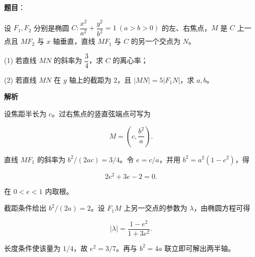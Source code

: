 \begin{answer}

\textbf{题目}：

设 $F_1,F_2$ 分别是椭圆 $C:\dfrac{x^2}{a^2}+\dfrac{y^2}{b^2}=1\ (a>b>0)$ 的左、右焦点，$M$ 是 $C$ 上一点且 $MF_2$ 与 $x$ 轴垂直，直线 $MF_1$ 与 $C$ 的另一个交点为 $N$。

(1) 若直线 $MN$ 的斜率为 $\dfrac34$，求 $C$ 的离心率；

(2) 若直线 $MN$ 在 $y$ 轴上的截距为 $2$，且 $|MN|=5|F_1N|$，求 $a,b$。

\textbf{解析}


设焦距半长为 $c$。过右焦点的竖直弦端点可写为

\nopagebreak[4]
\[
M=\left(c,\frac{b^2}{a}\right).
\]

直线 $MF_1$ 的斜率为 $b^2/(2ac)=3/4$。令 $e=c/a$，并用 $b^2=a^2(1-e^2)$，得

\nopagebreak[4]
\[
2e^2+3e-2=0.
\]

在 $0<e<1$ 内取根。


截距条件给出 $b^2/(2a)=2$。设 $F_1M$ 上另一交点的参数为 $\lambda$，由椭圆方程可得

\nopagebreak[4]
\[
|\lambda|=\frac{1-e^2}{1+3e^2}.
\]

长度条件使该量为 $1/4$，故 $e^2=3/7$。再与 $b^2=4a$ 联立即可解出两半轴。



\end{answer}
